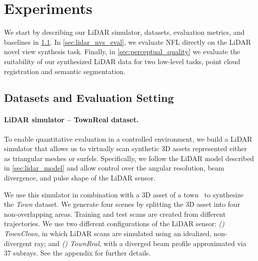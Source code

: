












\section{Experiments}
\label{sec:results}
We start by describing our LiDAR simulator,  datasets, evaluation metrics, and baselines in \cref{sec:dataset}. In \cref{sec:lidar_nvs_eval}, we evaluate NFL directly on the LiDAR novel view synthesis task. Finally, in \cref{sec:perceptual_quality} we evaluate the suitability of our synthesized LiDAR data for two low-level tasks, point cloud registration and semantic segmentation.




\subsection{Datasets and Evaluation Setting}
\label{sec:dataset}
\paragraph{LiDAR simulator -- TownReal dataset.} 
To enable quantitative evaluation in a controlled environment, we build a LiDAR simulator that allows us to virtually scan synthetic 3D assets represented either as triangular meshes or surfels. Specifically, we follow the LiDAR model described in \cref{sec:lidar_model} and allow control over the angular resolution, beam divergence, and pulse shape of the LiDAR sensor.  %

We use this simulator in combination with a 3D asset of a town~\cite{turbosquid} to synthesize the \emph{Town} dataset. We generate four scenes by splitting the 3D asset into four non-overlapping areas. Training and test scans %
are created from different trajectories.  We use two different configurations of the LiDAR sensor: \textit{()} \textit{TownClean}, in which LiDAR scans are simulated using an idealized, non-divergent ray; and \textit{()} \textit{TownReal}, with a diverged beam profile approximated via 37 subrays. See the appendix for further details.


